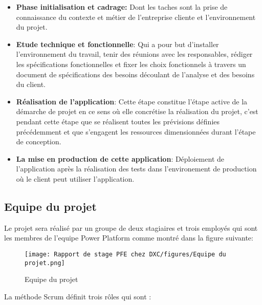 \begin{itemize}
  \item \textbf{Phase initialisation et cadrage: }
        Dont les taches sont la prise de connaissance du contexte et métier de
        l’entreprise cliente et l’environnement du projet.
    \\
    \item \textbf{Etude technique et fonctionnelle}: 
        Qui a pour but d’installer l’environnement du travail, tenir des réunions avec les responsables, rédiger les spécifications fonctionnelles et fixer les choix fonctionnels à travers un document de spécifications des besoins découlant de l’analyse et des besoins du client.
    \\    
    \item \textbf{Réalisation de l’application}: 
        Cette étape constitue l'étape active de la démarche de projet en ce sens où
        elle concrétise la réalisation du projet, c'est pendant cette étape que se réalisent toutes les prévisions définies précédemment et que s'engagent les ressources dimensionnées durant l'étape de conception.
    \\    
    \item \textbf{La mise en production de cette application}: 
        Déploiement de l’application après la réalisation des tests dans l'environement de production où le client peut utiliser l’application.
    \\    

\end{itemize}

\subsection{Equipe du projet}
Le projet sera réalisé par un groupe de deux stagiaires et trois employés qui sont les membres de l'equipe Power Platform comme montré dans la figure suivante:
\\

\begin{figure}[!h]
    \centering
    \texttt{[image: Rapport de stage PFE chez DXC/figures/Equipe du projet.png]}
    \caption{Equipe du projet}
\end{figure}

La méthode Scrum définit trois rôles qui sont :
\\

